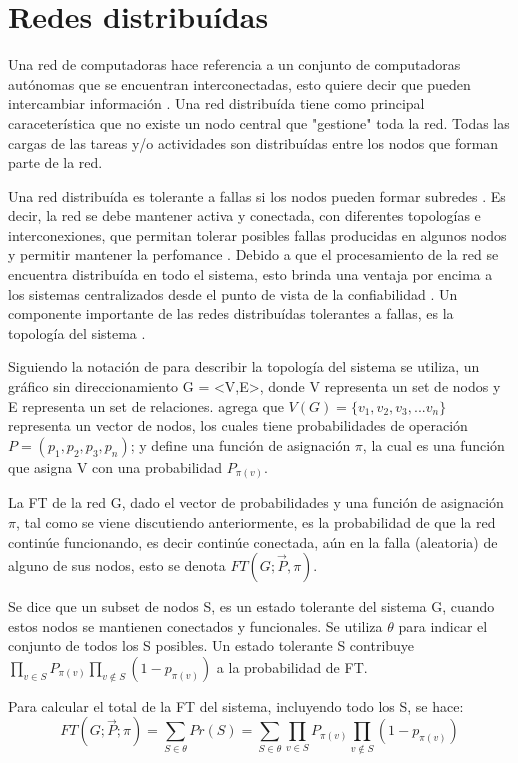 \section{Redes distribuídas}
Una red de computadoras hace referencia a un conjunto de computadoras autónomas que se encuentran interconectadas, esto quiere decir que pueden intercambiar información \citep{Tanenbaum12}. Una red distribuída tiene como principal caraceterística que no existe un nodo central que "gestione" toda la red. Todas las cargas de las tareas y/o actividades son distribuídas entre los nodos que forman parte de la red.

Una red distribuída es tolerante a fallas si los nodos pueden formar subredes \citep{Stivaros92}. Es decir, la red se debe mantener activa y conectada, con diferentes topologías e interconexiones, que permitan tolerar posibles fallas producidas en algunos nodos y permitir mantener la perfomance \citep{Stivaros92}. Debido a que el procesamiento de la red se encuentra distribuída en todo el sistema, esto brinda una ventaja por encima a los sistemas centralizados desde el punto de vista de la confiabilidad \citep{Pradhan82}. Un componente importante de las redes distribuídas tolerantes a fallas, es la topología del sistema \citep{Pradhan82}.

Siguiendo la notación de \cite{Pradhan82} para describir la topología del sistema se utiliza, un gráfico sin direccionamiento G = <V,E>, donde V representa un set de nodos y E representa un set de relaciones. \cite{Stivaros92} agrega que $V(G) = \{v_1,v_2,v_3, ... v_n \}$ representa un vector de nodos, los cuales tiene probabilidades de operación $P = (p_1, p_2, p_3, p_n)$; y define una función de asignación $\pi$, la cual es una función que asigna V con una probabilidad $P_{\pi(v)}$.

La \ac{FT} de la red G, dado el vector de probabilidades  y una función de asignación $\pi$, tal como se viene discutiendo anteriormente, es la probabilidad de que la red continúe funcionando, es decir continúe conectada, aún en la falla (aleatoria) de alguno de sus nodos, esto se denota $FT(G;\vec{P},\pi)$.

Se dice que un subset de nodos S, es un estado tolerante del sistema G, cuando estos nodos se mantienen conectados y funcionales. Se utiliza $\theta$ para indicar el conjunto de todos los S posibles. Un estado tolerante S contribuye $\prod_{v\in S}{P_{\pi (v)}} \prod_{v \notin S} (1-p_{\pi (v)})$ a la probabilidad de \ac{FT}.

Para calcular el total de la \ac{FT} del sistema, incluyendo todo los S, se hace: $$FT(G;\vec{P};\pi) = \sum_{S \in \theta}{Pr(S)} = \sum_{S \in \theta}{\prod_{v\in S}{P_{\pi (v)}} \prod_{v \notin S} (1-p_{\pi (v)})}$$

